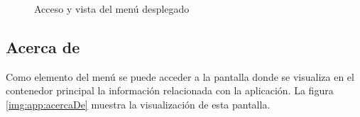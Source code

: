 \documentclass[../PFC.tex]{subfiles}
\begin{document}
\begin{figure}[H]
  \centering
  \null\hfill
  \caption{Acceso y vista del menú desplegado}
  \label{img:app:menuDesplegado}
\end{figure}

\subsection{Acerca de}
\label{App:AD:Acerca de}

Como elemento del menú se puede acceder a la pantalla donde se visualiza en el contenedor principal la información relacionada con la aplicación. La figura \ref{img:app:acercaDe} muestra la visualización de esta pantalla.
\end{document}
